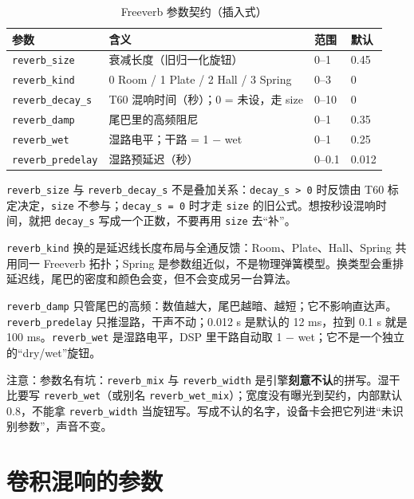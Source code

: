 \begin{table}[htbp]
\centering
\small
\begin{tabular}{@{}llll@{}}
\hline
参数 & 含义 & 范围 & 默认 \\
\hline
\texttt{reverb\_size} & 衰减长度（旧归一化旋钮） & 0–1 & 0.45 \\
\texttt{reverb\_kind} & 0 Room / 1 Plate / 2 Hall / 3 Spring & 0–3 & 0 \\
\texttt{reverb\_decay\_s} & T60 混响时间（秒）；0 = 未设，走 size & 0–10 & 0 \\
\texttt{reverb\_damp} & 尾巴里的高频阻尼 & 0–1 & 0.35 \\
\texttt{reverb\_wet} & 湿路电平；干路 = 1 − wet & 0–1 & 0.25 \\
\texttt{reverb\_predelay} & 湿路预延迟（秒） & 0–0.1 & 0.012 \\
\hline
\end{tabular}
\caption{Freeverb 参数契约（插入式）}
\label{tab:reverb-params}
\end{table}

\texttt{reverb\_size} 与 \texttt{reverb\_decay\_s} 不是叠加关系：\texttt{decay\_s > 0} 时反馈由 T60 标定决定，\texttt{size} 不参与；\texttt{decay\_s = 0} 时才走 \texttt{size} 的旧公式。想按秒设混响时间，就把 \texttt{decay\_s} 写成一个正数，不要再用 \texttt{size} 去“补”。

\texttt{reverb\_kind} 换的是延迟线长度布局与全通反馈：Room、Plate、Hall、Spring 共用同一 Freeverb 拓扑；Spring 是参数组近似，不是物理弹簧模型。换类型会重排延迟线，尾巴的密度和颜色会变，但不会变成另一台算法。

\texttt{reverb\_damp} 只管尾巴的高频：数值越大，尾巴越暗、越短；它不影响直达声。\texttt{reverb\_predelay} 只推湿路，干声不动；0.012 s 是默认的 12 ms，拉到 0.1 s 就是 100 ms。\texttt{reverb\_wet} 是湿路电平，DSP 里干路自动取 1 − wet；它不是一个独立的“dry/wet”旋钮。

注意：参数名有坑：\texttt{reverb\_mix} 与 \texttt{reverb\_width} 是引擎\textbf{刻意不认}的拼写。湿干比要写 \texttt{reverb\_wet}（或别名 \texttt{reverb\_wet\_mix}）；宽度没有曝光到契约，内部默认 0.8，不能拿 \texttt{reverb\_width} 当旋钮写。写成不认的名字，设备卡会把它列进“未识别参数”，声音不变。

\section{卷积混响的参数}

